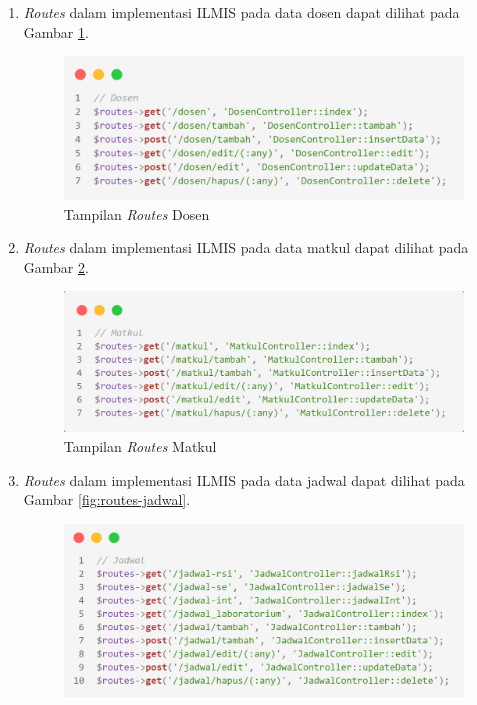 \begin{enumerate}
	\item \textit{Routes} dalam implementasi ILMIS pada data dosen dapat dilihat pada Gambar \ref{fig:routes-dosen}.
	      \begin{figure}
		      \centering
		      \includegraphics[width=1\linewidth]{konten//gambar/routes/dosen.png}
		      \caption{Tampilan \textit{Routes} Dosen}
		      \label{fig:routes-dosen}
	      \end{figure}
	\item \textit{Routes} dalam implementasi ILMIS pada data matkul dapat dilihat pada Gambar \ref{fig:routes-matkul}.
	      \begin{figure}
		      \centering
		      \includegraphics[width=1\linewidth]{konten//gambar/routes/matkul.png}
		      \caption{Tampilan \textit{Routes} Matkul}
		      \label{fig:routes-matkul}
	      \end{figure}
	\item \textit{Routes} dalam implementasi ILMIS pada data jadwal dapat dilihat pada Gambar \ref{fig:routes-jadwal}.
	      \begin{figure}
		      \centering
		      \includegraphics[width=1\linewidth]{konten//gambar/routes/jadwal.png}

\end{figure}
\end{enumerate}
